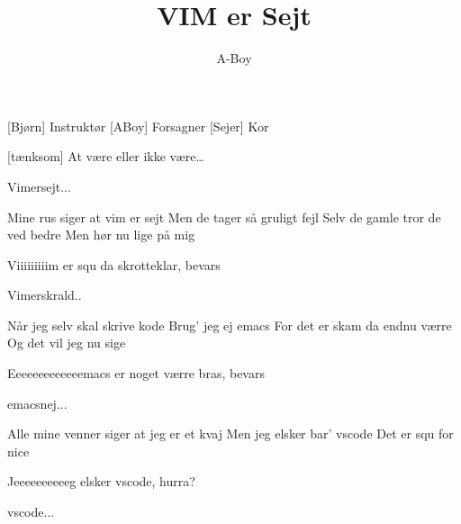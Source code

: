 \documentclass[a4paper,11pt]{article}
\title{VIM er Sejt}
\author{A-Boy}
\begin{document}
\maketitle

\begin{roles}
[Bjørn] Instruktør
[ABoy] Forsagner
[Sejer] Kor
\end{roles}

\begin{sketch}

[tænksom] At være eller ikke være\ldots {}

\end{sketch}
\begin{song}


%
Vimersejt...

%
Mine rus siger at vim er sejt
Men de tager så gruligt fejl
Selv de gamle tror de ved bedre
Men hør nu lige på mig

%
Viiiiiiiiim er squ da skrotteklar, bevars

%
Vimerskrald..

%
Når jeg selv skal skrive kode
Brug' jeg ej emacs
For det er skam da endnu værre 
Og det vil jeg nu sige

%
Eeeeeeeeeeeeemacs er noget værre bras, bevars 

%
emacsnej...

%
Alle mine venner siger 
at jeg er et kvaj
Men jeg elsker bar' vscode
Det er squ for nice

%
Jeeeeeeeeeeg elsker vscode, hurra?

%
vscode...

\end{song}
\end{document}
